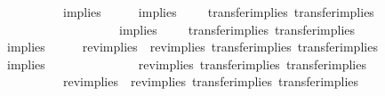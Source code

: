 \begin{isabellebody}
\ \ {\isachardoublequoteopen}{\isacharparenleft}{\kern0pt}{\isacharparenleft}{\kern0pt}{\isacharequal}{\kern0pt}{\isacharparenright}{\kern0pt}\ \ \ \ \ \ \ \ {\isacharequal}{\kern0pt}{\isacharequal}{\kern0pt}{\isacharequal}{\kern0pt}{\isachargreater}{\kern0pt}\ implies\ \ \ \ \ {\isacharequal}{\kern0pt}{\isacharequal}{\kern0pt}{\isacharequal}{\kern0pt}{\isachargreater}{\kern0pt}\ implies\ \ \ \ {\isacharparenright}{\kern0pt}\ transfer{\isacharunderscore}{\kern0pt}implies\ transfer{\isacharunderscore}{\kern0pt}implies{\isachardoublequoteclose}\isanewline
\ \ {\isachardoublequoteopen}{\isacharparenleft}{\kern0pt}{\isacharparenleft}{\kern0pt}{\isacharequal}{\kern0pt}{\isacharparenright}{\kern0pt}\ \ \ \ \ \ \ \ {\isacharequal}{\kern0pt}{\isacharequal}{\kern0pt}{\isacharequal}{\kern0pt}{\isachargreater}{\kern0pt}\ {\isacharparenleft}{\kern0pt}{\isacharequal}{\kern0pt}{\isacharparenright}{\kern0pt}\ \ \ \ \ \ \ \ {\isacharequal}{\kern0pt}{\isacharequal}{\kern0pt}{\isacharequal}{\kern0pt}{\isachargreater}{\kern0pt}\ implies\ \ \ \ {\isacharparenright}{\kern0pt}\ transfer{\isacharunderscore}{\kern0pt}implies\ transfer{\isacharunderscore}{\kern0pt}implies{\isachardoublequoteclose}\isanewline
\ \ {\isachardoublequoteopen}{\isacharparenleft}{\kern0pt}implies\ \ \ \ \ {\isacharequal}{\kern0pt}{\isacharequal}{\kern0pt}{\isacharequal}{\kern0pt}{\isachargreater}{\kern0pt}\ rev{\isacharunderscore}{\kern0pt}implies\ {\isacharequal}{\kern0pt}{\isacharequal}{\kern0pt}{\isacharequal}{\kern0pt}{\isachargreater}{\kern0pt}\ rev{\isacharunderscore}{\kern0pt}implies{\isacharparenright}{\kern0pt}\ transfer{\isacharunderscore}{\kern0pt}implies\ transfer{\isacharunderscore}{\kern0pt}implies{\isachardoublequoteclose}\isanewline
\ \ {\isachardoublequoteopen}{\isacharparenleft}{\kern0pt}implies\ \ \ \ \ {\isacharequal}{\kern0pt}{\isacharequal}{\kern0pt}{\isacharequal}{\kern0pt}{\isachargreater}{\kern0pt}\ {\isacharparenleft}{\kern0pt}{\isacharequal}{\kern0pt}{\isacharparenright}{\kern0pt}\ \ \ \ \ \ \ \ {\isacharequal}{\kern0pt}{\isacharequal}{\kern0pt}{\isacharequal}{\kern0pt}{\isachargreater}{\kern0pt}\ rev{\isacharunderscore}{\kern0pt}implies{\isacharparenright}{\kern0pt}\ transfer{\isacharunderscore}{\kern0pt}implies\ transfer{\isacharunderscore}{\kern0pt}implies{\isachardoublequoteclose}\isanewline
\ \ {\isachardoublequoteopen}{\isacharparenleft}{\kern0pt}{\isacharparenleft}{\kern0pt}{\isacharequal}{\kern0pt}{\isacharparenright}{\kern0pt}\ \ \ \ \ \ \ \ {\isacharequal}{\kern0pt}{\isacharequal}{\kern0pt}{\isacharequal}{\kern0pt}{\isachargreater}{\kern0pt}\ rev{\isacharunderscore}{\kern0pt}implies\ {\isacharequal}{\kern0pt}{\isacharequal}{\kern0pt}{\isacharequal}{\kern0pt}{\isachargreater}{\kern0pt}\ rev{\isacharunderscore}{\kern0pt}implies{\isacharparenright}{\kern0pt}\ transfer{\isacharunderscore}{\kern0pt}implies\ transfer{\isacharunderscore}{\kern0pt}implies{\isachardoublequoteclose}\isanewline

\end{isabellebody}
